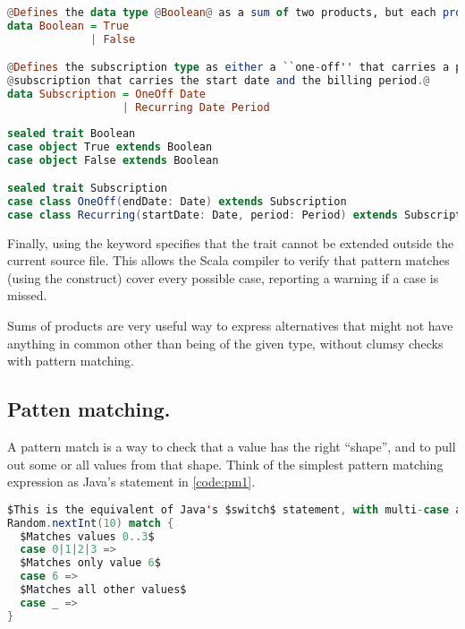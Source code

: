 \documentclass[10 pt]{article}
\begin{document}
\begin{lstlisting}[label={code:sum-haskell}, language=Haskell, escapechar=@]
@Defines the data type @Boolean@ as a sum of two products, but each product only has one value.@
data Boolean = True   
             | False

@Defines the subscription type as either a ``one-off'' that carries a particular end-date, or a recurring@
@subscription that carries the start date and the billing period.@
data Subscription = OneOff Date 
                  | Recurring Date Period
\end{lstlisting}
\begin{lstlisting}[caption={Sum types}, label={code:sum-scala}, language=Scala, escapechar=|]
sealed trait Boolean
case object True extends Boolean
case object False extends Boolean

sealed trait Subscription
case class OneOff(endDate: Date) extends Subscription
case class Recurring(startDate: Date, period: Period) extends Subscription
\end{lstlisting}

Finally, using the keyword  specifies that the trait cannot be extended outside the current source file. This allows the Scala compiler to verify that pattern matches (using the  construct) cover every possible case, reporting a warning if a case is missed.

Sums of products are very useful way to express alternatives that might not have anything in common other than being of the given type, without clumsy  checks with pattern matching.

\subsection{Patten matching.} 
A pattern match is a way to check that a value has the right ``shape'', and to pull out some or all values from that shape. Think of the simplest pattern matching expression as Java's  statement in \autoref{code:pm1}.

\begin{lstlisting}[caption={Pattern matching}, label={code:pm1}, language=Scala, escapechar=$]
$This is the equivalent of Java's $switch$ statement, with multi-case and a default case.$
Random.nextInt(10) match {
  $Matches values 0..3$
  case 0|1|2|3 =>
  $Matches only value 6$
  case 6 =>
  $Matches all other values$
  case _ =>
}
\end{lstlisting}
\end{document}
